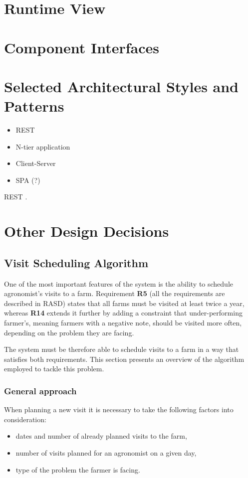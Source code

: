 \section{Runtime View}

\section{Component Interfaces}

\section{Selected Architectural Styles and Patterns}
\begin{itemize}
    \item REST
    \item N-tier application
    \item Client-Server
    \item SPA (?)
\end{itemize}
REST \cite{rest}.

\section{Other Design Decisions}

\subsection{Visit Scheduling Algorithm}

One of the most important features of the system is the ability to schedule agronomist's visits to a farm. Requirement \textbf{R5} (all the requirements are described in RASD) states that all farms must be visited at least twice a year, whereas \textbf{R14} extends it further by adding a constraint that under-performing farmer's, meaning farmers with a negative note, should be visited more often, depending on the problem they are facing.

The system must be therefore able to schedule visits to a farm in a way that satisfies both requirements. This section presents an overview of the algorithm employed to tackle this problem.

\subsubsection*{General approach}

When planning a new visit it is necessary to take the following factors into consideration:
\begin{itemize}
    \item dates and number of already planned visits to the farm,
    \item number of visits planned for an agronomist on a given day,
    \item type of the problem the farmer is facing.
\end{itemize}

